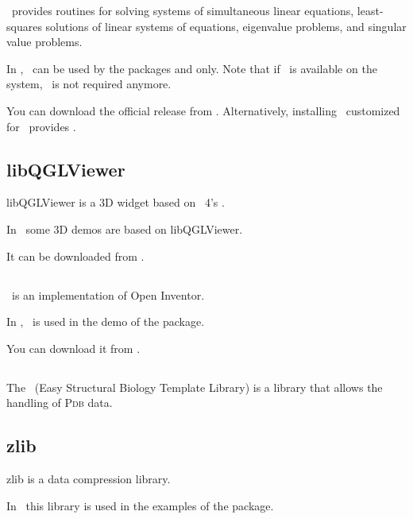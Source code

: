 \lapack\ provides routines for solving systems of simultaneous linear equations,
least-squares solutions of linear systems of equations, eigenvalue problems,
and singular value problems.

In \cgal, \lapack\ can be used by the packages
and  only.
Note that if \eigen\ is available on the system, \lapack\ is not
required anymore.

You can download the official release from \lapackpage.
Alternatively, installing \taucs\ customized for \cgal\ provides \lapack.

\subsection{libQGLViewer \label{thirdparty:libQGLViewer}}

libQGLViewer is a 3D widget based on \qt~4's .

In \cgal\ some 3D demos are based on libQGLViewer. 

It can be downloaded from \libqglviewerpage.

\subsection{\coin \label{thirdparty:Coin}}

\coin\ is an implementation of Open Inventor.  

In \cgal, \coin\ is used in the demo
of the  package. 

You can download it from \coinpage.

\subsection{\esbtl \label{thirdparty:ESBTL}}

The \esbtl\ (Easy Structural Biology Template Library) is a library that allows 
the handling of \textsc{Pdb} data.

\subsection{zlib \label{thirdparty:zlib}}

zlib is a data compression library.

In \cgal\ this library is used in the examples of the  package.


